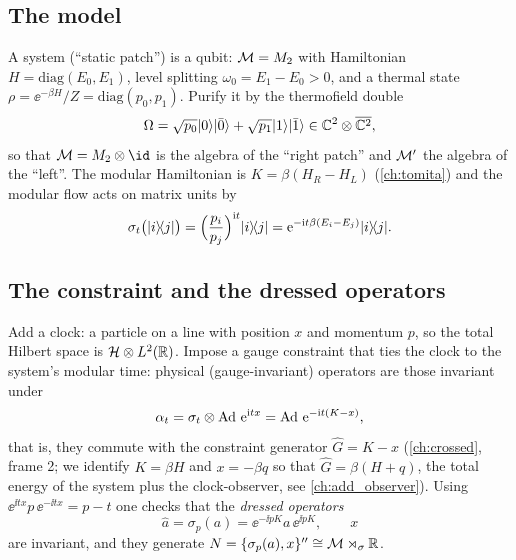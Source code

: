 \subsection{The model}

A system (``static patch'') is a qubit: $\mathcal{M}=M_2$ with Hamiltonian $H=\mathrm{diag}(E_0,E_1)$, level splitting $\omega_0=E_1-E_0>0$, and a thermal state $\rho=\ee^{-\beta H}/Z=\mathrm{diag}(p_0,p_1)$. Purify it by the thermofield double
\begin{equation}
\Omega=\sqrt{p_0}\lvert 0\rangle\lvert \bar0\rangle+\sqrt{p_1}\lvert 1\rangle\lvert \bar1\rangle\in\mathbb{C}^2\otimes\overline{\mathbb{C}^2},
\end{equation}
so that $\M=M_2\otimes\id$ is the algebra of the ``right patch'' and $\mathcal{M}'$ the algebra of the ``left''. The modular Hamiltonian is $K=\beta(H_R-H_L)$ (\cref{ch:tomita}) and the modular flow acts on matrix units by
\begin{equation}
\sigma_t\big(\lvert i\rangle\!\langle j\rvert\big)=\Big(\frac{p_i}{p_j}\Big)^{\mathrm{i} t}\lvert i\rangle\!\langle j\rvert=\mathrm{e}^{-\mathrm{i} t\beta(E_i-E_j)}\lvert i\rangle\!\langle j\rvert.
\end{equation}

\subsection{The constraint and the dressed operators}

Add a clock: a particle on a line with position $x$ and momentum $p$, so the total Hilbert space is $\mathcal{H}\otimes L^2(\mathbb{R})$. Impose a gauge constraint that ties the clock to the system's modular time: physical (gauge-invariant) operators are those invariant under
\begin{equation}
\alpha_t=\sigma_t\otimes\operatorname{Ad}\,\mathrm{e}^{\mathrm{i} tx}=\operatorname{Ad}\,\mathrm{e}^{-\mathrm{i} t(K-x)},
\end{equation}
that is, they commute with the constraint generator $\hat G=K-x$ (\cref{ch:crossed}, frame 2; we identify $K=\beta H$ and $x=-\beta q$ so that $\hat G=\beta(H+q)$, the total energy of the system plus the clock-observer, see \cref{ch:add_observer}). Using $\ee^{\ii tx}p\,\ee^{-\ii tx}=p-t$ one checks that the \emph{dressed operators}
\begin{equation}
\hat a=\sigma_p(a)=\ee^{-\ii pK}a\,\ee^{\ii pK},\qquad x
\end{equation}
are invariant, and they generate $N=\{\sigma_p(a),x\}''\cong\mathcal{M}\rtimes_\sigma\mathbb{R}$.


